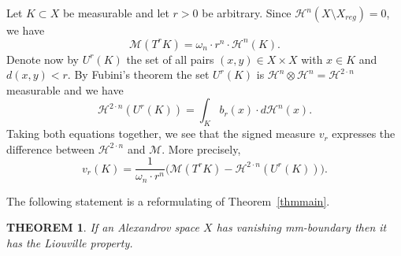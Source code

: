 \documentclass[12pt,leqno,intlimits]{amsart}
\numberwithin{equation}{section}
\newtheorem{thm}{THEOREM}[section]
\theoremstyle{definition}
\theoremstyle{remark}
\newcommand{\tref}[1]{Theorem~\ref{#1}}
\begin{document}
Let $K\subset X$ be measurable and let $r>0$ be arbitrary.
Since $\mathcal H^n (X\setminus X_{reg} )=0$, we have
$$\mathcal M (T^{r} K) =\omega _n \cdot r^n \cdot \mathcal H^n (K).$$
Denote now by $U^r(K)$
the set of all pairs $(x,y)\in X\times X$ with $x\in K$ and $d(x,y)<r$.
By Fubini's theorem the set $U^r(K)$ is $\mathcal H^n \otimes \mathcal H^n =\mathcal H^{2\cdot n}$ measurable and we have
$$\mathcal H^{2\cdot n} (U^r (K))= \int _K b_r (x) \cdot d\mathcal H^n (x). $$
Taking both equations together, we see that the signed measure $v_r$ expresses the difference between $\mathcal H^{2\cdot n}$ and $\mathcal M$. More precisely,
\begin{equation} \label{eq:compare}
v_r (K) = \frac 1 {\omega_n \cdot r^n} \Big(\mathcal M (T^r K)- \mathcal H^{2\cdot n} (U^r (K)) \Big).
\end{equation}

The following statement is a reformulating of \tref{thmmain}.

\begin{thm} \label{reform}
If an Alexandrov space $X$ has vanishing  mm-boundary then it has the Liouville property.
\end{thm}
\end{document}
